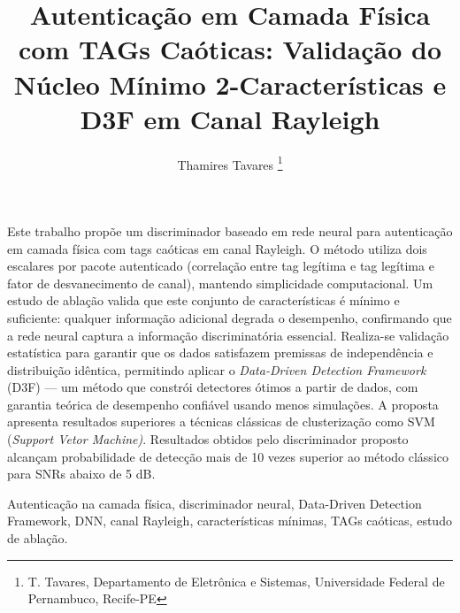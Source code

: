 \documentclass{sbrt}
\begin{document}
\title{Autenticação em Camada Física com TAGs Caóticas: Validação do Núcleo Mínimo 2-Características e D3F em Canal Rayleigh}

\author{Thamires Tavares
\thanks{T. Tavares, Departamento de Eletrônica e Sistemas, Universidade Federal de Pernambuco, Recife-PE}%
}

\maketitle


\begin{resumo}
Este trabalho propõe um discriminador baseado em rede neural para autenticação em camada física com tags caóticas em canal Rayleigh. O método utiliza dois escalares por pacote autenticado (correlação entre tag legítima e tag legítima e fator de desvanecimento de canal), mantendo simplicidade computacional. Um estudo de ablação valida que este conjunto de características é mínimo e suficiente: qualquer informação adicional degrada o desempenho, confirmando que a rede neural captura a informação discriminatória essencial. Realiza-se validação estatística para garantir que os dados satisfazem premissas de independência e distribuição idêntica, permitindo aplicar o \textit{Data-Driven Detection Framework} (D3F) --- um método que constrói detectores ótimos a partir de dados, com garantia teórica de desempenho confiável usando menos simulações. A proposta apresenta resultados superiores a técnicas clássicas de clusterização como SVM (\textit{Support Vetor Machine)}. Resultados obtidos pelo discriminador proposto alcançam probabilidade de detecção mais de 10 vezes superior ao método clássico para SNRs abaixo de 5 dB.

\end{resumo}

\begin{chave}
Autenticação na camada física, discriminador neural, Data-Driven Detection Framework, DNN, canal Rayleigh, características mínimas, TAGs caóticas, estudo de ablação.
\end{chave}
\end{document}
